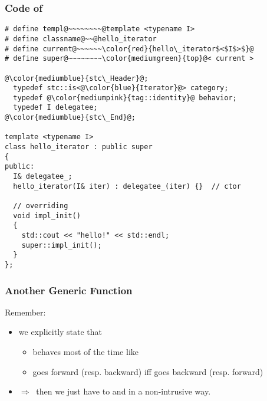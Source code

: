 \begin{frame}[fragile]
  \frametitle{Code of \bfhelloiteratorI}

\begin{lstlisting}[escapechar=@,basicstyle={\tiny\sffamily}]
# define templ@~~~~~~~~@template <typename I>
# define classname@~~@hello_iterator
# define current@~~~~~~\color{red}{hello\_iterator$<$I$>$}@
# define super@~~~~~~~~\color{mediumgreen}{top}@< current >

@\color{mediumblue}{stc\_Header}@;
  typedef stc::is<@\color{blue}{Iterator}@> category;
  typedef @\color{mediumpink}{tag::identity}@ behavior;
  typedef I delegatee;
@\color{mediumblue}{stc\_End}@;

template <typename I>
class hello_iterator : public super
{
public:
  I& delegatee_;
  hello_iterator(I& iter) : delegatee_(iter) {}  // ctor

  // overriding
  void impl_init()
  {
    std::cout << "hello!" << std::endl;
    super::impl_init();
  }
};
\end{lstlisting}

\end{frame}





\begin{frame}[fragile]
  \frametitle{Another Generic Function}

Remember:
\smallskip

\begin{itemize}
\scriptsize
\item we {\color{mediumgreen}explicitly} state that \bfreverseT
  \begin{itemize} \scriptsize
  \item behaves most of the time like \bfT
  \item goes forward (resp. backward) iff \bfI goes backward (resp. forward)
  \end{itemize}
\item $\Rightarrow ~ $ then we just have to {\color{red}{implement}} \bfprev and \bfnext in a  {\color{mediumgreen}non-intrusive} way.
\end{itemize}

\end{frame}




